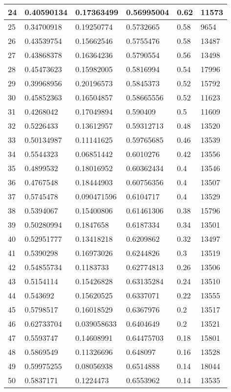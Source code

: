 \begin{longtable}{|l|l|l|l|l|l|}
24 & 0.40590134 & 0.17363499 & 0.56995004 & 0.62 & 11573 \\ \hline 
25 & 0.34700918 & 0.19250774 & 0.5732665 & 0.58 & 9654 \\ \hline 
26 & 0.43539754 & 0.15662546 & 0.5755476 & 0.58 & 13487 \\ \hline 
27 & 0.43868378 & 0.16364236 & 0.5790554 & 0.56 & 13498 \\ \hline 
28 & 0.45473623 & 0.15982005 & 0.5816994 & 0.54 & 17996 \\ \hline 
29 & 0.39968956 & 0.20196573 & 0.5845373 & 0.52 & 15792 \\ \hline 
30 & 0.45852363 & 0.16504857 & 0.58665556 & 0.52 & 11623 \\ \hline 
31 & 0.4268042 & 0.17049894 & 0.590409 & 0.5 & 11609 \\ \hline 
32 & 0.5226433 & 0.13612957 & 0.59312713 & 0.48 & 13520 \\ \hline 
33 & 0.50134987 & 0.11141625 & 0.59765685 & 0.46 & 13539 \\ \hline 
34 & 0.5544323 & 0.06851442 & 0.6010276 & 0.42 & 13556 \\ \hline 
35 & 0.4899532 & 0.18016952 & 0.60362434 & 0.4 & 13546 \\ \hline 
36 & 0.4767548 & 0.18444903 & 0.60756356 & 0.4 & 13507 \\ \hline 
37 & 0.5745478 & 0.090471596 & 0.6104717 & 0.4 & 13529 \\ \hline 
38 & 0.5394067 & 0.15400806 & 0.61461306 & 0.38 & 15796 \\ \hline 
39 & 0.50280994 & 0.1847658 & 0.6187334 & 0.34 & 13501 \\ \hline 
40 & 0.52951777 & 0.13418218 & 0.6209862 & 0.32 & 13497 \\ \hline 
41 & 0.5390298 & 0.16973026 & 0.6244826 & 0.3 & 13519 \\ \hline 
42 & 0.54855734 & 0.1183733 & 0.62774813 & 0.26 & 13506 \\ \hline 
43 & 0.5154114 & 0.15426828 & 0.63135284 & 0.24 & 13510 \\ \hline 
44 & 0.543692 & 0.15620525 & 0.6337071 & 0.22 & 13555 \\ \hline 
45 & 0.5798517 & 0.16018529 & 0.6367976 & 0.2 & 13517 \\ \hline 
46 & 0.62733704 & 0.039058633 & 0.6404649 & 0.2 & 13521 \\ \hline 
47 & 0.5593747 & 0.14608991 & 0.64475703 & 0.18 & 15801 \\ \hline 
48 & 0.5869549 & 0.11326696 & 0.648097 & 0.16 & 13528 \\ \hline 
49 & 0.59975255 & 0.08056938 & 0.6514888 & 0.14 & 18044 \\ \hline 
50 & 0.5837171 & 0.1224473 & 0.6553962 & 0.14 & 13535 \\ \hline 
\end{longtable}
